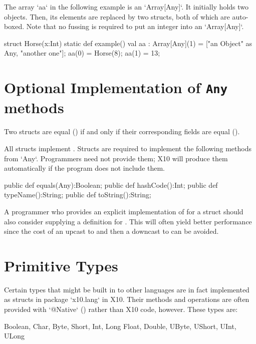 \begin{ex}
The array \xcd`aa` in the following example is an \xcd`Array[Any]`.  It
initially holds two objects.  Then, its elements are replaced by two structs,
both of which are auto-boxed.  Note that no fussing is required to put an
integer into an \xcd`Array[Any]`.  
\begin{xten}
struct Horse(x:Int){
  static def example(){
    val aa : Array[Any](1) = ["an Object" as Any, "another one"];
    aa(0) = Horse(8);
    aa(1) = 13;
  }
}
\end{xten}
%


\end{ex}

\section{Optional Implementation of {\tt Any} methods}
\label{StructAnyMethods}

Two
structs are equal (\Xcd{==}) if and only if their corresponding fields
are equal (\Xcd{==}). 

All structs implement . 
Structs are required to implement the following methods from \xcd`Any`.  
Programmers need not provide them; X10 will produce them automatically if 
the program does not include them. 
\begin{xten}
  public def equals(Any):Boolean;
  public def hashCode():Int;
  public def typeName():String;
  public def toString():String;  
\end{xten}


A programmer who provides an explicit implementation
of  for a struct  should also consider
supplying a definition for . This will often
yield better performance since the cost of an upcast to  and
then a downcast to  can be avoided.

\section{Primitive Types}

Certain types that might be built in to other languages are in fact
implemented as structs in package \xcd`x10.lang` in X10. Their methods and
operations are often provided with \xcd`@Native` () rather
than X10 code, however. These types are:
\begin{xten}
Boolean, Char, Byte, Short, Int, Long
Float, Double, UByte, UShort, UInt, ULong
\end{xten}

